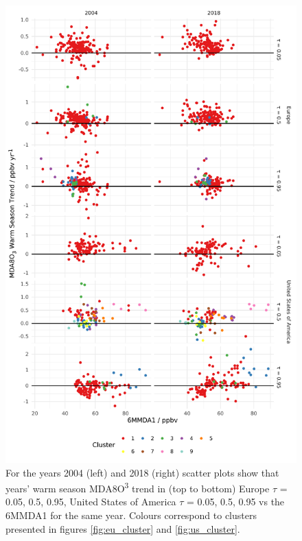 \documentclass[journal abbreviation, manuscript]{copernicus}
\begin{document}
\begin{figure}[p]
\centering
\includegraphics[height=0.9\textheight]{figures/paper_figures/f10_mda8_warm_cluster_mda8_6mmda1.pdf}
\caption{For the years 2004 (left) and 2018 (right) scatter plots show that years' warm season MDA8O\textsuperscript{3} trend in (top to bottom) Europe $\tau$ = 0.05, 0.5, 0.95, United States of America $\tau$ = 0.05, 0.5, 0.95 vs the 6MMDA1 for the same year. Colours correspond to clusters presented in figures \ref{fig:eu_cluster} and \ref{fig:us_cluster}.}
\label{fig:mda8_warm_cluster_mda8_6mmda1}
\end{figure}
\clearpage
\end{document}
